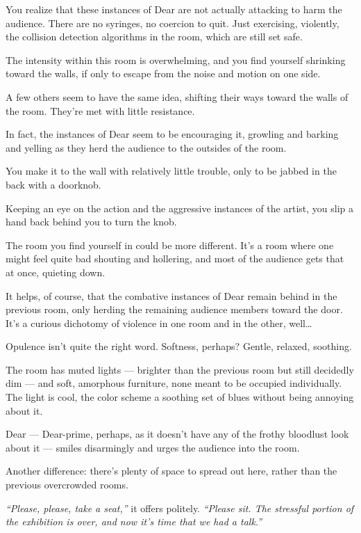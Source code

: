 You realize that these instances of Dear are not actually attacking to harm the audience. There are no syringes, no coercion to quit. Just exercising, violently, the collision detection algorithms in the room, which are still set safe.

The intensity within this room is overwhelming, and you find yourself shrinking toward the walls, if only to escape from the noise and motion on one side.

A few others seem to have the same idea, shifting their ways toward the walls of the room. They're met with little resistance.

In fact, the instances of Dear seem to be encouraging it, growling and barking and yelling as they herd the audience to the outsides of the room.

You make it to the wall with relatively little trouble, only to be jabbed in the back with a doorknob.

Keeping an eye on the action and the aggressive instances of the artist, you slip a hand back behind you to turn the knob.

\newpage

The room you find yourself in could be more different. It's a room where one might feel quite bad shouting and hollering, and most of the audience gets that at once, quieting down.

It helps, of course, that the combative instances of Dear remain behind in the previous room, only herding the remaining audience members toward the door. It's a curious dichotomy of violence in one room and in the other, well\ldots{}

Opulence isn't quite the right word. Softness, perhaps? Gentle, relaxed, soothing.

The room has muted lights --- brighter than the previous room but still decidedly dim --- and soft, amorphous furniture, none meant to be occupied individually. The light is cool, the color scheme a soothing set of blues without being annoying about it.

Dear --- Dear-prime, perhaps, as it doesn't have any of the frothy bloodlust look about it --- smiles disarmingly and urges the audience into the room.

Another difference: there's plenty of space to spread out here, rather than the previous overcrowded rooms.

\emph{``Please, please, take a seat,''} it offers politely. \emph{``Please sit. The stressful portion of the exhibition is over, and now it's time that we had a talk.''}

